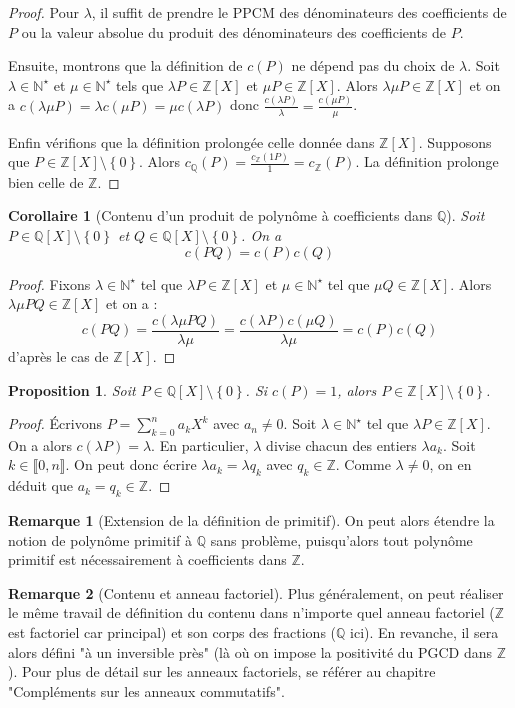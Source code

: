 \documentclass[french]{book}
\newcommand{\N}{\mathbb{N}}
\newcommand{\Z}{\mathbb{Z}}
\newcommand{\Q}{\mathbb{Q}}
\newcommand{\st}{^\star}
\theoremstyle{plain}
\newtheorem{prop}{Proposition}[chapter]
\newtheorem{cor}{Corollaire}[chapter]
\theoremstyle{definition}
\newtheorem{rmq}{Remarque}[chapter]
\theoremstyle{remark}
\begin{document}
\begin{proof}
	Pour $\lambda$, il suffit de prendre le PPCM des dénominateurs des coefficients de $P$ ou la valeur absolue du produit des dénominateurs des coefficients de $P$. \par Ensuite, montrons que la définition de $c(P)$ ne dépend pas du choix de $\lambda$. Soit $\lambda\in\N\st$ et $\mu\in\N\st$ tels que $\lambda P\in\Z[X]$ et $\mu P\in\Z[X]$. Alors $\lambda\mu P\in\Z[X]$ et on a $c(\lambda\mu P)=\lambda c(\mu P)=\mu c(\lambda P)$ donc $\displaystyle \frac{c(\lambda P)}{\lambda}=\frac{c(\mu P)}{\mu}$. \par Enfin vérifions que la définition prolongée celle donnée dans $\Z[X]$. Supposons que $P\in\Z[X]\setminus\left\{0\right\}$. Alors $c_\Q(P)=\frac{c_\Z(1P)}{1}=c_\Z(P)$. La définition prolonge bien celle de $\Z$.
\end{proof}
\begin{cor}[Contenu d'un produit de polynôme à coefficients dans $\Q$]
	Soit $P\in\Q[X]\setminus\left\{0\right\}$ et $Q\in\Q[X]\setminus\left\{0\right\}$. On a $$c(PQ)=c(P)c(Q)$$
\end{cor}
\begin{proof}
	Fixons $\lambda\in\N\st$ tel que $\lambda P\in\Z[X]$ et $\mu\in\N\st$ tel que $\mu Q\in\Z[X]$. Alors $\lambda\mu PQ\in\Z[X]$ et on a : $$c(PQ)=\frac{c(\lambda\mu PQ)}{\lambda\mu}=\frac{c(\lambda P)c(\mu Q)}{\lambda \mu}=c(P)c(Q)$$ d'après le cas de $\Z[X]$.
\end{proof}
\begin{prop}
	Soit $P\in\Q[X]\setminus\left\{0\right\}$. Si $c(P)=1$, alors $P\in\Z[X]\setminus\left\{0\right\}$.
\end{prop}
\begin{proof}
	Écrivons $P=\displaystyle\sum_{k=0}^{n}a_kX^k$ avec $a_n\ne0$. Soit $\lambda\in\N\st$ tel que $\lambda P\in\Z[X]$. On a alors $c(\lambda P)=\lambda$. En particulier, $\lambda$ divise chacun des entiers $\lambda a_k$.  Soit $k\in\llbracket0,n\rrbracket$. On peut donc écrire $\lambda a_k=\lambda q_k$ avec $q_k\in\Z$. Comme $\lambda\ne0$, on en déduit que $a_k=q_k\in\Z$.
\end{proof}
\begin{rmq}[Extension de la définition de primitif]
	On peut alors étendre la notion de polynôme primitif à $\Q$ sans problème, puisqu'alors tout polynôme primitif est nécessairement à coefficients dans $\Z$.
\end{rmq}
\begin{rmq}[Contenu et anneau factoriel]
	Plus généralement, on peut réaliser le même travail de définition du contenu dans n'importe quel anneau factoriel ($\Z$ est factoriel car principal) et son corps des fractions ($\Q$ ici). En revanche, il sera alors défini "à un inversible près" (là où on impose la positivité du PGCD dans $\Z$). Pour plus de détail sur les anneaux factoriels, se référer au chapitre "Compléments sur les anneaux commutatifs".
\end{rmq}
\end{document}
